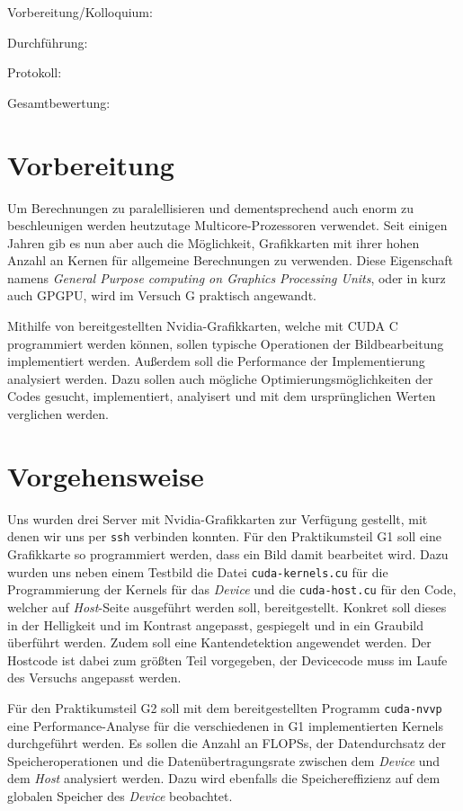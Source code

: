 \documentclass[12pt,a4paper]{scrartcl}
\begin{document}
Vorbereitung/Kolloquium:

Durchf\"uhrung:

Protokoll:

Gesamtbewertung:
\clearpage



\section{Vorbereitung}

Um Berechnungen zu paralellisieren und dementsprechend auch enorm zu beschleunigen werden heutzutage Multicore-Prozessoren verwendet.
Seit einigen Jahren gib es nun aber auch die M\"oglichkeit, Grafikkarten mit ihrer hohen Anzahl an Kernen f\"ur allgemeine Berechnungen zu verwenden.
Diese Eigenschaft namens \textit{General Purpose computing on Graphics Processing Units}, oder in kurz auch GPGPU, wird im Versuch G praktisch angewandt.

Mithilfe von bereitgestellten Nvidia-Grafikkarten, welche mit CUDA C programmiert werden k\"onnen, sollen typische Operationen der Bildbearbeitung implementiert werden.
Au\ss erdem soll die Performance der Implementierung analysiert werden.
Dazu sollen auch m\"ogliche Optimierungsm\"oglichkeiten der Codes gesucht, implementiert, analyisert und mit dem urspr\"unglichen Werten verglichen werden.


\section{Vorgehensweise}
Uns wurden drei Server mit Nvidia-Grafikkarten zur Verf\"ugung gestellt, mit denen wir uns per \texttt{ssh} verbinden konnten.
F\"ur den Praktikumsteil G1 soll eine Grafikkarte so programmiert werden, dass ein Bild damit bearbeitet wird.
Dazu wurden uns neben einem Testbild die Datei \texttt{cuda-kernels.cu} f\"ur die Programmierung der Kernels f\"ur das \textit{Device} und die \texttt{cuda-host.cu} f\"ur den Code, welcher auf \textit{Host}-Seite ausgef\"uhrt werden soll, bereitgestellt.
Konkret soll dieses in der Helligkeit und im Kontrast angepasst, gespiegelt und in ein Graubild \"uberf\"uhrt werden.
Zudem soll eine Kantendetektion angewendet werden.
Der Hostcode ist dabei zum gr\"o\ss ten Teil vorgegeben, der Devicecode muss im Laufe des Versuchs angepasst werden.

F\"ur den Praktikumsteil G2 soll mit dem bereitgestellten Programm \texttt{cuda-nvvp} eine Performance-Analyse f\"ur die verschiedenen in G1 implementierten Kernels durchgef\"uhrt werden.
Es sollen die Anzahl an FLOPSs, der Datendurchsatz der Speicheroperationen und die Daten\"ubertragungsrate zwischen dem \textit{Device} und dem \textit{Host} analysiert werden.
Dazu wird ebenfalls die Speichereffizienz auf dem globalen Speicher des \textit{Device} beobachtet.
\end{document}
